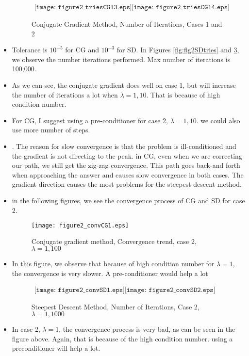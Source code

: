\begin{itemize}
\begin{figure}[H]
    \centering
    $\begin{array}{cc}
        \texttt{[image: figure2\_triesCG13.eps]} 
        \texttt{[image: figure2\_triesCG14.eps]} 
    \end{array}$        
    \caption{Conjugate Gradient Method, Number of Iterations,  Cases 1 and 2 }
    \label{fig:fig2CGtries}
\end{figure}

\item Tolerance is $10^{-5}$ for CG and $10^{-3}$ for SD. In Figures \ref{fig:fig2SDtries} and \ref{fig:fig2CGtries}, we observe the number iterations performed. Max number of iterations is 100,000.

\item As we can see, the conjugate gradient does well on case 1, but will increase the number of iterations a lot when $\lambda=1,10$. That is because of high condition number.
\item For CG, I suggest using a pre-conditioner for case 2, $\lambda=1,10$. we could also use more number of steps.
\item. The reason for slow convergence is that the problem is ill-conditioned and the gradient is not directing to the peak. in CG, even when we are correcting our path, we still get the zig-zag convergence. This path goes back-and forth when approaching the answer and causes slow convergence in both cases. The gradient direction causes the most problems for the steepest descent method.
    
\item in the following figures, we see the convergence process of CG and SD for case 2.

\begin{figure}[H]
    \centering
    \texttt{[image: figure2\_convCG1.eps]} 
    \caption{Conjugate gradient method, Convergence trend,  case 2, $\lambda=1,100$}
    \label{fig:fig2CGconv1}
\end{figure}

\item In this figure, we observe that because of high condition number for $\lambda=1$, the convergence is very slower. A pre-conditioner would help a lot

\begin{figure}[H]
    \centering
    $\begin{array}{cc}
        \texttt{[image: figure2\_convSD1.eps]} 
        \texttt{[image: figure2\_convSD2.eps]} 
    \end{array}$        
    \caption{Steepest Descent Method, Number of Iterations,  Case 2, $\lambda=1,1000$ }
    \label{fig:fig2CGtries}
\end{figure}

\item In case 2, $\lambda=1$, the convergence process is very bad, as can be seen in the figure above. Again, that is because of the high condition number. using a preconditioner will help a lot.


\end{itemize}
